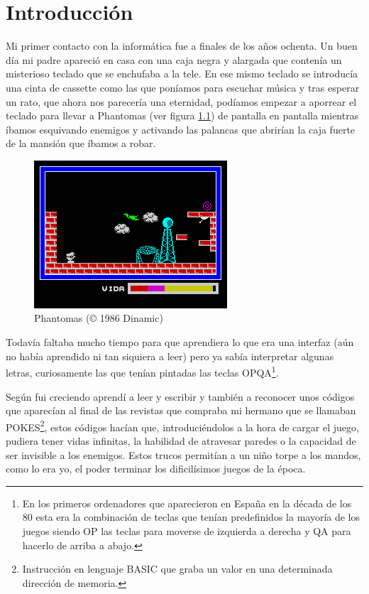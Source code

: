 \chapter{Introducción}

Mi primer contacto con la informática fue a finales de los años ochenta. Un buen día mi padre apareció en casa con una caja negra y alargada que contenía un misterioso teclado que se enchufaba a la tele. En ese mismo teclado se introducía una cinta de cassette como las que poníamos para escuchar música y tras esperar un rato, que ahora nos parecería una eternidad, podíamos empezar a aporrear el teclado para llevar a Phantomas (ver figura \ref{fig:phantomas}) de pantalla en pantalla mientras íbamos esquivando enemigos y activando las palancas que abrirían la caja fuerte de la mansión que íbamos a robar.


\begin{figure}[h!]
\centering
\includegraphics{../screenshots/phantomas-sp1}
\caption{Phantomas (© 1986 Dinamic)}
\label{fig:phantomas}
\end{figure}

\bigskip
Todavía faltaba mucho tiempo para que aprendiera lo que era una interfaz (aún no había aprendido ni tan siquiera a leer) pero ya sabía interpretar algunas letras, curiosamente las que tenían pintadas las teclas OPQA\footnote{En los primeros ordenadores que aparecieron en España en la década de los 80 esta era la combinación de teclas que tenían predefinidos la mayoría de los juegos siendo OP las teclas para moverse de izquierda a derecha y QA para hacerlo de arriba a abajo.}.

\bigskip
Según fui creciendo aprendí a leer y escribir y también a reconocer unos códigos que aparecían al final de las revistas que compraba mi hermano que se llamaban POKES\footnote{Instrucción en lenguaje BASIC que graba un valor en una determinada dirección de memoria.}, estos códigos hacían que, introduciéndolos a la hora de cargar el juego, pudiera tener vidas infinitas, la habilidad de atravesar paredes o la capacidad de ser invisible a los enemigos. Estos trucos permitían a un niño torpe a los mandos, como lo era yo, el poder terminar los dificilísimos juegos de la época.

